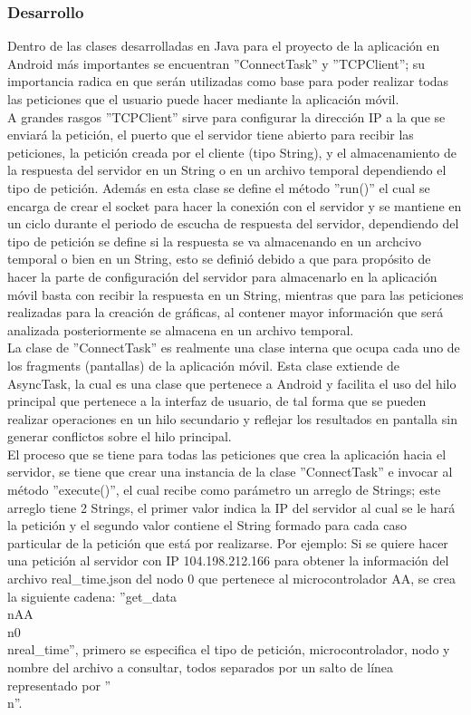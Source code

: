\subsubsection{Desarrollo}
Dentro de las clases desarrolladas en Java para el proyecto de la aplicación en Android más importantes se encuentran ''ConnectTask'' y ''TCPClient''; su importancia radica en que serán utilizadas como base para poder realizar todas las peticiones que el usuario puede hacer mediante la aplicación móvil.
\\ \newline
A grandes rasgos ''TCPClient'' sirve para configurar la dirección IP a la que se enviará la petición, el puerto que el servidor tiene abierto para recibir las peticiones, la petición creada por el cliente (tipo String), y el almacenamiento de la respuesta del servidor en un String o en un archivo temporal dependiendo el tipo de petición. Además en esta clase se define el método ''run()'' el cual se encarga de crear el socket para hacer la conexión con el servidor y se mantiene en un ciclo durante el periodo de escucha de respuesta del servidor, dependiendo del tipo de petición se define si la respuesta se va almacenando en un archcivo temporal o bien en un String, esto se definió debido a que para propósito de hacer la parte de configuración del servidor para almacenarlo en la aplicación móvil basta con recibir la respuesta en un String, mientras que para las peticiones realizadas para la creación de gráficas, al contener mayor información que será analizada posteriormente se almacena en un archivo temporal.
\\ \newline
La clase de ''ConnectTask'' es realmente una clase interna que ocupa cada uno de los fragments (pantallas) de la aplicación móvil. Esta clase extiende de AsyncTask, la cual es una clase que pertenece a Android y facilita el uso del hilo principal que pertenece a la interfaz de usuario, de tal forma que se pueden realizar operaciones en un hilo secundario y reflejar los resultados en pantalla sin generar conflictos sobre el hilo principal.
\\ \newline
El proceso que se tiene para todas las peticiones que crea la aplicación hacia el servidor, se tiene que crear una instancia de la clase ''ConnectTask'' e invocar al método ''execute()'', el cual recibe como parámetro un arreglo de Strings; este arreglo tiene 2 Strings, el primer valor indica la IP del servidor al cual se le hará la petición y el segundo valor contiene el String formado para cada caso particular de la petición que está por realizarse. Por ejemplo: Si se quiere hacer una petición al servidor con IP 104.198.212.166 para obtener la información del archivo real\_time.json del nodo 0 que pertenece al microcontrolador AA, se crea la siguiente cadena: ''get\_data\\nAA\\n0\\nreal\_time'', primero se especifica el tipo de petición, microcontrolador, nodo y nombre del archivo a consultar, todos separados por un salto de línea representado por ''\\n''.
